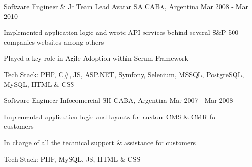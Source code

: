 \begin{cventries}
  \cventry
    {Software Engineer \& Jr Team Lead}
    {Avatar SA}
    {CABA, Argentina}
    {Mar 2008 - Mar 2010}
    {
      \begin{cvitems}
        \item {Implemented application logic and wrote API services behind several S\&P 500 companies websites among others}
        \item {Played a key role in Agile Adoption within Scrum Framework}
        \item {Tech Stack: PHP, C\#, JS, ASP.NET, Symfony, Selenium, MSSQL, PostgreSQL, MySQL, HTML \& CSS}
      \end{cvitems}
    }

  \cventry
    {Software Engineer}
    {Infocomercial SH}
    {CABA, Argentina}
    {Mar 2007 - Mar 2008}
    {
      \begin{cvitems}
        \item {Implemented application logic and layouts for custom CMS \& CMR for customers}
        \item {In charge of all the technical support \& assistance for customers}
        \item {Tech Stack: PHP, MySQL, JS, HTML \& CSS}
      \end{cvitems}
    }

\end{cventries}
